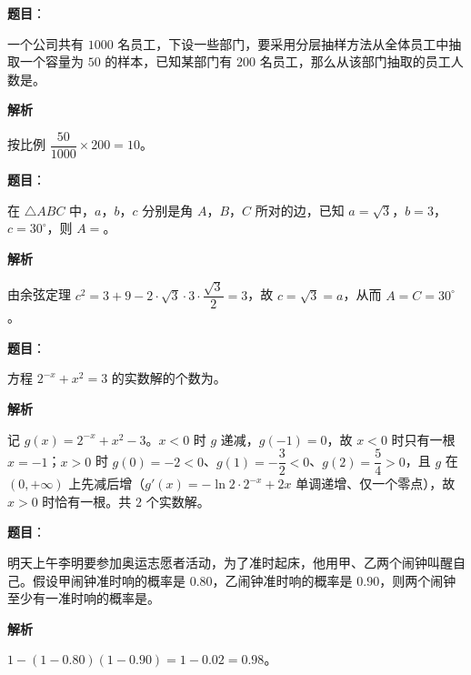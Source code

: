 \begin{answer}

\textbf{题目}：

一个公司共有 $1000$ 名员工，下设一些部门，要采用分层抽样方法从全体员工中抽取一个容量为 $50$ 的样本，已知某部门有 $200$ 名员工，那么从该部门抽取的员工人数是\gkblank{}。

\textbf{解析}

按比例 $\dfrac{50}{1000}\times200=10$。


\end{answer}
\begin{answer}

\textbf{题目}：

在 $\triangle ABC$ 中，$a$，$b$，$c$ 分别是角 $A$，$B$，$C$ 所对的边，已知 $a=\sqrt3$，$b=3$，$c=30^\circ$，则 $A=$\gkblank{}。

\textbf{解析}

由余弦定理 $c^2=3+9-2\cdot\sqrt3\cdot3\cdot\dfrac{\sqrt3}2=3$，故 $c=\sqrt3=a$，从而 $A=C=30^\circ$。


\end{answer}
\begin{answer}

\textbf{题目}：

方程 $2^{-x}+x^2=3$ 的实数解的个数为\gkblank{}。

\textbf{解析}

记 $g(x)=2^{-x}+x^2-3$。$x<0$ 时 $g$ 递减，$g(-1)=0$，故 $x<0$ 时只有一根 $x=-1$；$x>0$ 时 $g(0)=-2<0$、$g(1)=-\dfrac32<0$、$g(2)=\dfrac54>0$，且 $g$ 在 $(0,+\infty)$ 上先减后增（$g'(x)=-\ln2\cdot2^{-x}+2x$ 单调递增、仅一个零点），故 $x>0$ 时恰有一根。共 $2$ 个实数解。


\end{answer}
\begin{answer}

\textbf{题目}：

明天上午李明要参加奥运志愿者活动，为了准时起床，他用甲、乙两个闹钟叫醒自己。假设甲闹钟准时响的概率是 $0.80$，乙闹钟准时响的概率是 $0.90$，则两个闹钟至少有一准时响的概率是\gkblank{}。

\textbf{解析}

$1-(1-0.80)(1-0.90)=1-0.02=0.98$。


\end{answer}
